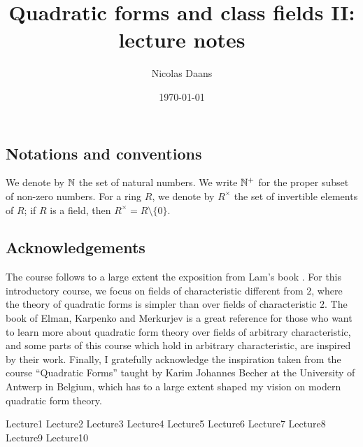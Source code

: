 \documentclass[12pt, leqno, british]{amsart}
\title{Quadratic forms and class fields II: lecture notes}
\author{Nicolas Daans}
\date{\today}
\begin{document}
\maketitle
\tableofcontents

\subsection*{Notations and conventions}
We denote by $\mathbb N$ the set of natural numbers.
We write $\mathbb N^+$ for the proper subset of non-zero numbers.
For a ring $R$, we denote by $R^\times$ the set of invertible elements of $R$; if $R$ is a field, then $R^\times = R \setminus \lbrace 0 \rbrace$.

\subsection*{Acknowledgements}
The course follows to a large extent the exposition from Lam's book \autocite{Lam}.
For this introductory course, we focus on fields of characteristic different from $2$, where the theory of quadratic forms is simpler than over fields of characteristic $2$.
The book of Elman, Karpenko and Merkurjev \autocite{ElmanKarpenkoMerkurjev} is a great reference for those who want to learn more about quadratic form theory over fields of arbitrary characteristic, and some parts of this course which hold in arbitrary characteristic, are inspired by their work.
Finally, I gratefully acknowledge the inspiration taken from the course ``Quadratic Forms'' taught by Karim Johannes Becher at the University of Antwerp in Belgium, which has to a large extent shaped my vision on modern quadratic form theory.

{Lecture1}
{Lecture2}
{Lecture3}
{Lecture4}
{Lecture5}
{Lecture6}
{Lecture7}
{Lecture8}
{Lecture9}
{Lecture10}

\printindex
\printbibliography
\end{document}
